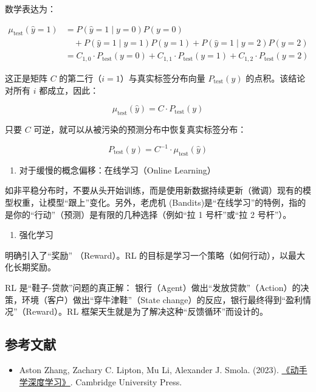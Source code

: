 数学表达为：

\[
\begin{aligned}
\mu_{\mathrm{test}}(\hat{y}=1)
&=P(\hat{y}=1\mid y=0)P(y=0)\\
&\quad+P(\hat{y}=1\mid y=1)P(y=1)
+P(\hat{y}=1\mid y=2)P(y=2)\\
&=C_{1,0}\cdot P_{\mathrm{test}}(y=0)
+C_{1,1}\cdot P_{\mathrm{test}}(y=1)
+C_{1,2}\cdot P_{\mathrm{test}}(y=2)
\end{aligned}
\]

这正是矩阵 \(C\) 的第二行（\(i=1\)）与真实标签分布向量 \(P_{\mathrm{test}}(y)\) 的点积。该结论对所有 \(i\) 都成立，因此：

\[
\mu_{\mathrm{test}}(\hat{y})=C\cdot P_{\mathrm{test}}(y)
\]

只要 \(C\) 可逆，就可以从被污染的预测分布中恢复真实标签分布：

\[
P_{\mathrm{test}}(y)=C^{-1}\cdot\mu_{\mathrm{test}}(\hat{y})
\]

\begin{enumerate}
\def\labelenumi{\arabic{enumi}.}
\setcounter{enumi}{2}
\tightlist
\item
  对于缓慢的概念偏移：在线学习（Online Learning）
\end{enumerate}

如非平稳分布时，不要从头开始训练，而是使用新数据持续更新（微调）现有的模型权重，让模型``跟上''变化。另外，老虎机 (Bandits)是``在线学习''的特例，指的是你的``行动''（预测）是有限的几种选择（例如``拉 1 号杆''或``拉 2 号杆''）。

\begin{enumerate}
\def\labelenumi{\arabic{enumi}.}
\setcounter{enumi}{3}
\tightlist
\item
  强化学习
\end{enumerate}

明确引入了``奖励'' （Reward）。RL 的目标是学习一个策略（如何行动），以最大化长期奖励。

RL 是``鞋子-贷款''问题的真正解： 银行（Agent）做出``发放贷款''（Action）的决策，环境（客户）做出``穿牛津鞋''（State change）的反应，银行最终得到``盈利情况''（Reward）。RL 框架天生就是为了解决这种``反馈循环''而设计的。

\hypertarget{ux53c2ux8003ux6587ux732e-8}{%
\subsection{参考文献}\label{ux53c2ux8003ux6587ux732e-8}}

\begin{itemize}
\tightlist
\item
  Aston Zhang, Zachary C. Lipton, Mu Li, Alexander J. Smola. (2023). \href{https://zh.d2l.ai/}{《动手学深度学习》}. Cambridge University Press.
\end{itemize}

\clearpage
